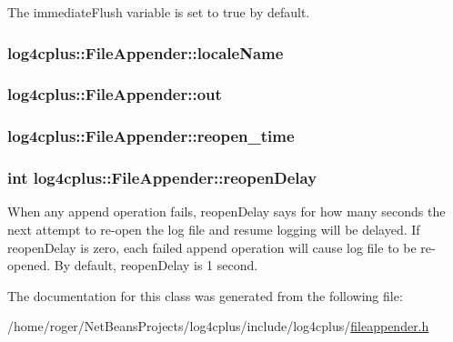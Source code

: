 The {\ttfamily immediate\-Flush} variable is set to {\ttfamily true} by default. \hypertarget{classlog4cplus_1_1FileAppender_a02862bbb42d5dfa02a5121d7bd25d2a0}{
\subsubsection[{locale\-Name}]{ log4cplus\-::\-File\-Appender\-::locale\-Name\hspace{0.3cm}{\ttfamily [protected]}}}\label{classlog4cplus_1_1FileAppender_a02862bbb42d5dfa02a5121d7bd25d2a0}
\hypertarget{classlog4cplus_1_1FileAppender_a34206d2d34fe3e66e1a8a623c6c22cfe}{
\subsubsection[{out}]{ log4cplus\-::\-File\-Appender\-::out\hspace{0.3cm}{\ttfamily [protected]}}}\label{classlog4cplus_1_1FileAppender_a34206d2d34fe3e66e1a8a623c6c22cfe}
\hypertarget{classlog4cplus_1_1FileAppender_accdc4c309ec3586059ab7431690c0a2b}{
\subsubsection[{reopen\-\_\-time}]{ log4cplus\-::\-File\-Appender\-::reopen\-\_\-time\hspace{0.3cm}{\ttfamily [protected]}}}\label{classlog4cplus_1_1FileAppender_accdc4c309ec3586059ab7431690c0a2b}
\hypertarget{classlog4cplus_1_1FileAppender_a094e4ae84c02d9bcfee5e7837e681e80}{
\subsubsection[{reopen\-Delay}]{\setlength{\rightskip}{0pt plus 5cm}int log4cplus\-::\-File\-Appender\-::reopen\-Delay\hspace{0.3cm}{\ttfamily [protected]}}}\label{classlog4cplus_1_1FileAppender_a094e4ae84c02d9bcfee5e7837e681e80}
When any append operation fails, {\ttfamily reopen\-Delay} says for how many seconds the next attempt to re-\/open the log file and resume logging will be delayed. If {\ttfamily reopen\-Delay} is zero, each failed append operation will cause log file to be re-\/opened. By default, {\ttfamily reopen\-Delay} is 1 second. 

The documentation for this class was generated from the following file\-:\begin{DoxyCompactItemize}
\item 
/home/roger/\-Net\-Beans\-Projects/log4cplus/include/log4cplus/\hyperlink{fileappender_8h}{fileappender.\-h}\end{DoxyCompactItemize}
